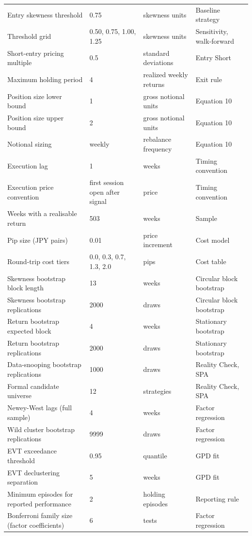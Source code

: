 \documentclass[11pt]{article}
\begin{document}
\begin{table}[H]
\begin{tabular}{@{}llll@{}}
Entry skewness threshold & 0.75 & skewness units & Baseline strategy \\
Threshold grid & 0.50, 0.75, 1.00, 1.25 & skewness units & Sensitivity, walk-forward \\
Short-entry pricing multiple & 0.5 & standard deviations & Entry Short \\
Maximum holding period & 4 & realized weekly returns & Exit rule \\
Position size lower bound & 1 & gross notional units & Equation 10 \\
Position size upper bound & 2 & gross notional units & Equation 10 \\
Notional sizing & weekly & rebalance frequency & Equation 10 \\
Execution lag & 1 & weeks & Timing convention \\
Execution price convention & first session open after signal & price & Timing convention \\
Weeks with a realisable return & 503 & weeks & Sample \\
Pip size (JPY pairs) & 0.01 & price increment & Cost model \\
Round-trip cost tiers & 0.0, 0.3, 0.7, 1.3, 2.0 & pips & Cost table \\
Skewness bootstrap block length & 13 & weeks & Circular block bootstrap \\
Skewness bootstrap replications & 2000 & draws & Circular block bootstrap \\
Return bootstrap expected block & 4 & weeks & Stationary bootstrap \\
Return bootstrap replications & 2000 & draws & Stationary bootstrap \\
Data-snooping bootstrap replications & 1000 & draws & Reality Check, SPA \\
Formal candidate universe & 12 & strategies & Reality Check, SPA \\
Newey-West lags (full sample) & 4 & weeks & Factor regression \\
Wild cluster bootstrap replications & 9999 & draws & Factor regression \\
EVT exceedance threshold & 0.95 & quantile & GPD fit \\
EVT declustering separation & 5 & weeks & GPD fit \\
Minimum episodes for reported performance & 2 & holding episodes & Reporting rule \\
Bonferroni family size (factor coefficients) & 6 & tests & Factor regression \\

\end{tabular}
\end{table}
\end{document}
